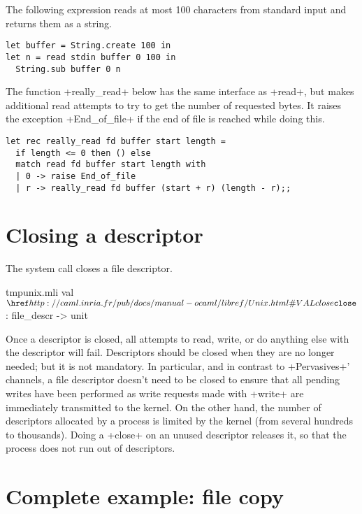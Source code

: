 \begin{example} 
The following expression reads at most 100 characters from standard
input and returns them as a string.
%
\begin{lstlisting}
let buffer = String.create 100 in
let n = read stdin buffer 0 100 in
  String.sub buffer 0 n
\end{lstlisting}
\end{example}

\begin{example} 
The function \ml+really_read+ below has the same interface as
\ml+read+, but makes additional read attempts to try to get
the number of requested bytes. It raises the exception
\ml+End_of_file+ if the end of file is reached while doing this.
%
\begin{lstlisting}
let rec really_read fd buffer start length =
  if length <= 0 then () else
  match read fd buffer start length with
  | 0 -> raise End_of_file
  | r -> really_read fd buffer (start + r) (length - r);;
\end{lstlisting}
%
\end{example}

\section{Closing a descriptor}

The system call  closes a file descriptor.
%
\begin{listingcodefile}{tmpunix.mli}
val $\libvalue{Unix}{close}$ : file_descr -> unit
\end{listingcodefile}
% 

Once a descriptor is closed, all attempts to read, write, or do
anything else with the descriptor will fail. Descriptors should be
closed when they are no longer needed; but it is not mandatory. In
particular, and in contrast to \ml+Pervasives+'
channels, a file descriptor doesn't need to be closed to ensure that
all pending writes have been performed as write requests made with
\ml+write+ are immediately transmitted to the kernel. On the other
hand, the number of descriptors allocated by a process is limited by
the kernel (from several hundreds to thousands). Doing a \ml+close+ on
an unused descriptor releases it, so that the process does not run out
of descriptors.

\section{\label{ex/filecopy}Complete example: file copy}

